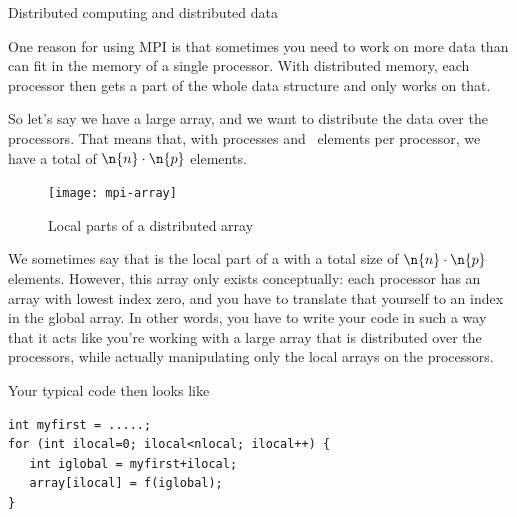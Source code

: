 
 {Distributed computing and distributed data}

One reason for using MPI is that sometimes you need to work on
more data than can fit in the memory of a single processor.
With distributed memory, each processor then gets a part
of the whole data structure and only works on that.

So let's say we have a large array, and we want to
distribute the data over the processors.
That means that, with  processes and ~elements
per processor, we have a total of $\n{n}\cdot\n{p}$ elements.

\begin{figure}[ht]
  \texttt{[image: mpi-array]}
  \caption{Local parts of a distributed array}
  \label{fig:mpi-array}
\end{figure}

We sometimes say that  is the local part
of a  with a total size of
$\n{n}\cdot\n{p}$ elements.
However, this array only exists
conceptually: each processor has an array with lowest index zero,
and you have to translate that yourself to an index in the global
array.
In other words, you have to write your code in such a way that
it acts like you're working with a large array that is distributed
over the processors, while
actually manipulating only the local arrays on the processors.

Your typical code then looks like
\begin{verbatim}
int myfirst = .....;
for (int ilocal=0; ilocal<nlocal; ilocal++) {
   int iglobal = myfirst+ilocal;
   array[ilocal] = f(iglobal);
}
\end{verbatim}

